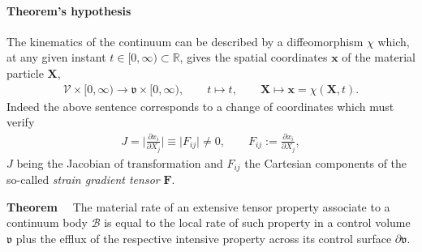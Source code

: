 \paragraph{Theorem's hypothesis}
The kinematics of the continuum can be described by a diffeomorphism
$\chi$ which, at any given instant $t\in [0,\infty)\subset\mathbb{R}$,
  gives the spatial coordinates $\mathbf{x}$ of the material particle
  $\mathbf{X}$,
\begin{align*}
\mathscr{V}\times[0,\infty)\rightarrow \mathfrak{v}\times[0,\infty),
    \qquad t \mapsto t, \qquad
    \mathbf{X}\mapsto\mathbf{x}=\chi(\mathbf{X},t).
\end{align*}
Indeed the above sentence corresponds to a change of coordinates which
must verify
\begin{align*}
J=\bigg\vert\frac{\partial{x}_i}{\partial{X}_j}\bigg\vert\equiv
\big\vert{F_{ij}}\big\vert\neq{0}, \qquad
F_{ij}:=\frac{\partial{x}_i}{\partial{X}_j},
\end{align*}
$J$ being the Jacobian of transformation and $F_{ij}$ the Cartesian
components of the so-called {\em strain gradient tensor} $\mathbf{F}$.

{\bf Theorem$\quad$} The material rate of an extensive tensor property
associate to a continuum body $\mathscr{B}$ is equal to the local rate
of such property in a control volume $\mathfrak{v}$ plus the efflux of
the respective intensive property across its control surface
$\partial\mathfrak{v}$.

